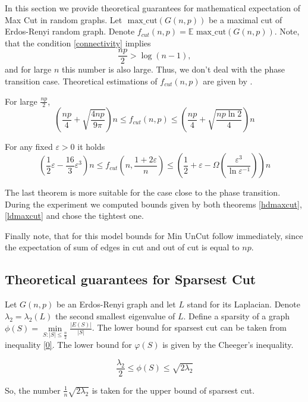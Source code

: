 \documentclass[12pt]{article}
\begin{document}
In this section we provide theoretical guarantees for mathematical expectation of Max 
Cut in random graphs.
Let $\text{ max\_cut}( G(n, p) )$ be a maximal cut of Erdos-Renyi random graph.
Denote $f_{cut} (n, p) = \mathbb E \text{ max\_cut}( G(n, p) )$.
Note, that the condition \ref{connectivity} implies
\[
	\frac{np}2 > \log(n-1),
\]
and for large $n$ this number is also large.
Thus, we don't deal with the phase transition case.
Theoretical estimations of $f_{cut} (n, p)$ are given by \cite{ERMaxCut}.
\begin{Th}
\label{hdmaxcut}
	For large $\frac{np}2$,
	\[
		\left( \frac{np}4 + \sqrt{\frac{4np}{9\pi}} \right) n \leq f_{cut}(n, p) \leq
		\left( \frac{np}4 + \sqrt{\frac{np \ln 2}{4}} \right) n
	\]
\end{Th}

\begin{Th}
\label{ldmaxcut}
	For any fixed $\varepsilon > 0$ it holds
	\[
	\left( \frac12 \varepsilon - \frac{16}3 \varepsilon^3 \right) n \leq
	f_{cut}\left( n, \frac{1 + 2\varepsilon}n \right) \leq
	\left( \frac12 + \varepsilon - \Omega\left( \frac{\varepsilon^3}{\ln \varepsilon^{-1}} 
	\right) \right) n
	\]
\end{Th}
The last theorem is more suitable for the case close to the phase transition.
During the experiment we computed bounds given by both theorems \ref{hdmaxcut}, 
\ref{ldmaxcut} and chose the tightest one.

Finally note, that for this model bounds for Min UnCut follow immediately, since the 
expectation of sum of edges in cut and out of cut is equal to $np$.





\subsection{Theoretical guarantees for Sparsest Cut}\label{spcutbounds}

Let $G(n, p)$ be an Erdos-Renyi graph and let $L$ stand for its Laplacian.
Denote $\lambda_2 = \lambda_2(L)$ the second smallest eigenvalue of $L$.
Define a sparsity of a graph $\phi(S) = \min\limits_{S : |S| \leq \frac n2} \frac{ | E(S) | 
}{|S|}$.
The lower bound for sparsest cut can be taken from inequality \ref{0}.
The lower bound for $\varphi(S)$ is given by the Cheeger's inequality.
\begin{Th}
\label{cheeger}
	\[
		\frac{\lambda_2}2 \leq \phi(S) \leq \sqrt{2 \lambda_2}
	\]
\end{Th}
So, the number $\frac1n\sqrt{2 \lambda_2}$ is taken for the upper bound of sparsest cut.
\end{document}
